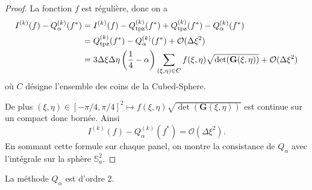 \begin{proof}
La fonction $f$ est régulière, donc on a
\begin{align*}
I^{(k)}(f) - Q^{(k)}_{\alpha}(f^*) & = I^{(k)}(f) - Q^{(k)}_{\text{tpz}}(f^*) + Q^{(k)}_{\text{tpz}}(f^*) - Q^{(k)}_{\alpha}(f^*)\\
	& =  Q^{(k)}_{\text{tpz}}(f^*) - Q^{(k)}_{\alpha}(f^*) + \mathcal{O}(\Delta \xi^2) \\
	& = 3\Delta \xi \Delta \eta \left( \dfrac{1}{4} - \alpha \right) \displaystyle\sum\limits_{(\xi, \eta) \in C} f(\xi, \eta) \sqrt{\det(\mathbf{G}(\xi, \eta))}  + \mathcal{O}(\Delta \xi^2)
\end{align*}
où $C$ désigne l'ensemble des coins de la Cubed-Sphere.

De plus $(\xi, \eta) \in [-\pi/4, \pi/4]^2 \mapsto f(\xi, \eta) \sqrt{\det(\mathbf{G}(\xi, \eta))}$ est continue sur un compact donc bornée. Ainsi
\begin{equation}
I^{(k)}(f) - Q^{(k)}_{\alpha}(f^*) = \mathcal{O}(\Delta \xi^2).
\end{equation}
En sommant cette formule sur chaque panel, on montre la consistance de $Q_{\alpha}$ avec l'intégrale sur la sphère $\mathbb{S}_a^2$.
\end{proof}

\begin{proposition}
La méthode $Q_{\alpha}$ est d'ordre 2.
\end{proposition}

